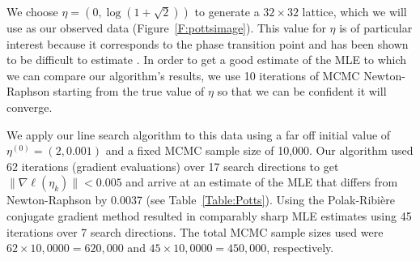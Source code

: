 We choose $\eta = \left(0, \log(1 + \sqrt{2} ) \right)$ to generate a $32 \times 32$ 
lattice, which we will use as 
our observed data (Figure~\ref{F:pottsimage}).  This value for $\eta$ is of particular 
interest because it corresponds 
to the phase transition point \citep{Potts} and has been shown to be difficult to 
estimate \citep{Geyer:1990}.  In 
order to get a good estimate of the MLE to which we can compare our algorithm's 
results, we use 10 iterations of MCMC Newton-Raphson \citep{Penttinen:1984} starting 
from the true value of $\eta$ so that we can be confident it will converge.

%



We apply our line search algorithm to this data using a far off initial value of $
\eta^{(0)} = ( 2, 0.001)$ and a 
fixed MCMC sample size of 10,000.  Our algorithm used 62 iterations (gradient 
evaluations) over 17 search directions to 
get  $\lVert \nabla \ell( \eta_k ) \rVert < 0.005$ and arrive at an estimate of the 
MLE that differs from Newton-Raphson
by 0.0037 (see Table~\ref{Table:Potts}).   Using the Polak-Ribi\`{e}re conjugate 
gradient method resulted in 
comparably sharp MLE estimates using 45 iterations over 7 search directions.  The 
total MCMC sample sizes used were $62\times10,0000 = 620,000$ and $45\times10,0000 = 
450,000$, respectively.




